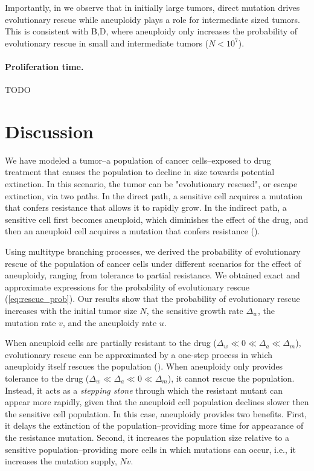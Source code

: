 \documentclass[12pt]{extarticle}
\begin{document}
Importantly, in  we observe that in initially large tumors, direct mutation drives evolutionary rescue while aneuploidy plays a role for intermediate sized tumors. %
This is consistent with B,D, where aneuploidy only increases the probability of evolutionary rescue in small and intermediate tumors ($N<10^7$).

\paragraph{Proliferation time.}

TODO

\section*{Discussion}

We have modeled a tumor--a population of cancer cells--exposed to drug treatment that causes the population to decline in size towards potential extinction.
In this scenario, the tumor can be "evolutionary rescued", or escape extinction, via two paths. In the direct path, a sensitive cell acquires a mutation that confers resistance that allows it to rapidly grow. In the indirect path, a sensitive cell first becomes aneuploid, which diminishes the effect of the drug, and then an aneuploid cell acquires a mutation that confers resistance ().

Using multitype branching processes, we derived the probability of evolutionary rescue of the population of cancer cells under different scenarios for the effect of aneuploidy, ranging from tolerance to partial resistance.
We obtained exact and approximate expressions for the probability of evolutionary rescue (\cref{eq:rescue_prob}).
Our results show that the probability of evolutionary rescue increases with the initial tumor size $N$, the sensitive growth rate $\Delta_w$, the mutation rate $v$, and the aneuploidy rate $u$.

When aneuploid cells are partially resistant to the drug ($\Delta_w\ll0\ll\Delta_a\ll\Delta_m$), evolutionary rescue can be approximated by a one-step process in which aneuploidy itself rescues the population (). 
When aneuploidy only provides tolerance to the drug ($\Delta_w\ll\Delta_a\ll0\ll\Delta_m$), it cannot rescue the population.
Instead, it acts as a \emph{stepping stone} through which the resistant mutant can appear more rapidly, given that the aneuploid cell population declines slower then the sensitive cell population. In this case, aneuploidy provides two benefits. First, it delays the extinction of the population--providing more time for appearance of the resistance mutation. Second, it increases the population size relative to a sensitive population--providing more cells in which mutations can occur, i.e., it increases the mutation supply, $Nv$.
\end{document}
